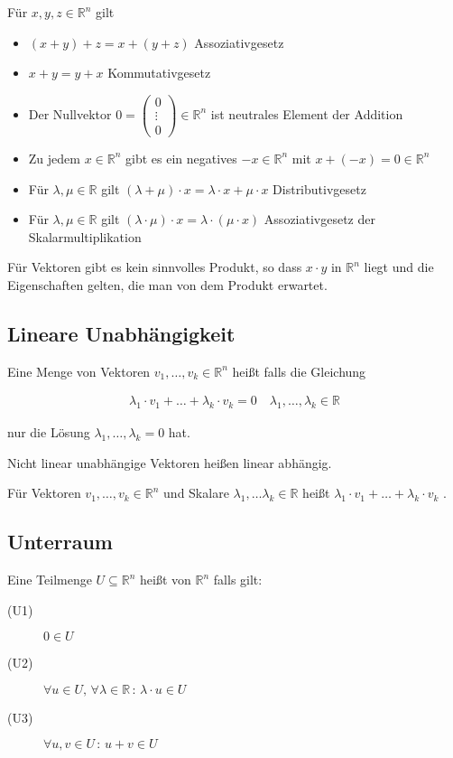 Für $x,y,z \in \mathbb{R}^n$ gilt
\begin{itemize}
	\item{$(x+y)+z = x+(y+z)$ Assoziativgesetz}
	\item{$x+y = y+x$ Kommutativgesetz}
	\item{Der Nullvektor $0 = \begin{pmatrix}0 \\ \vdots \\ 0\end{pmatrix} \in \mathbb{R}^n$ ist neutrales Element der Addition}
	\item{Zu jedem $x \in \mathbb{R}^n$ gibt es ein \glqq{}negatives\grqq{} $-x \in \mathbb{R}^n$ mit $x + (-x) = 0 \in \mathbb{R}^n$}
	\item{Für $\lambda,\mu \in \mathbb{R}$ gilt $(\lambda + \mu)\cdot x = \lambda \cdot x + \mu \cdot x$ Distributivgesetz}
	\item{Für $\lambda,\mu \in \mathbb{R}$ gilt $(\lambda \cdot \mu) \cdot x = \lambda \cdot (\mu \cdot x)$ Assoziativgesetz der Skalarmultiplikation}
\end{itemize}

Für Vektoren gibt es kein \glqq{}sinnvolles\grqq{} Produkt, so dass $x\cdot y$ in $\mathbb{R}^n$ liegt und die Eigenschaften gelten, die man von dem Produkt erwartet.

\subsection{Lineare Unabhängigkeit}
Eine Menge von Vektoren $v_1,\dots,v_k \in \mathbb{R}^n$ heißt  falls die Gleichung

\begin{align*}
	\lambda _1 \cdot v_1 +\dots+\lambda _k \cdot v_k = 0\quad \lambda _1,\dots,\lambda _k \in \mathbb{R}
\end{align*}

nur die Lösung $\lambda _1,\dots,\lambda _k = 0$ hat.

Nicht linear unabhängige Vektoren heißen linear abhängig.

Für Vektoren $v_1,\dots,v_k \in \mathbb{R}^n$ und Skalare $\lambda _1,\dots\lambda _k \in \mathbb{R}$ heißt $\lambda _1 \cdot v_1+\dots+\lambda _k \cdot v_k$ .

\subsection{Unterraum}
Eine Teilmenge $U \subseteq \mathbb{R}^n$ heißt  von $\mathbb{R}^n$ falls gilt:
\begin{description}
	\item[(U1)]{$0 \in U$}
	\item[(U2)]{$\forall u \in U,\, \forall \lambda \in \mathbb{R}\,:\,\lambda \cdot u \in U$}
	\item[(U3)]{$\forall u,v \in U\,:\,u+v \in U$}
\end{description}

